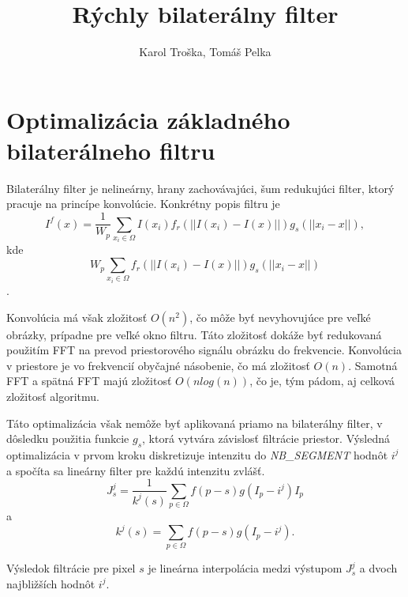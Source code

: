 \documentclass[]{article}
\title{Rýchly bilaterálny filter}
\author{Karol Troška, Tomáš Pelka}
\begin{document}
\maketitle

\section*{Optimalizácia základného bilaterálneho filtru}

Bilaterálny filter je nelineárny, hrany zachovávajúci, šum redukujúci filter, ktorý pracuje na princípe konvolúcie. Konkrétny popis filtru je  $$I^f(x)=\frac{1}{W_p} \sum_{x_i\in \Omega}I(x_i)f_r(||I(x_i) - I(x)||)g_s(||x_i - x||),$$kde $$W_p \sum_{x_i\in \Omega}f_r(||I(x_i) - I(x)||)g_s(||x_i - x||)$$.

Konvolúcia má však zložitosť $O(n^2)$, čo môže byť nevyhovujúce pre veľké obrázky, prípadne pre veľké okno filtru. Táto zložitosť dokáže byť redukovaná použitím FFT na prevod priestorového signálu obrázku do frekvencie. Konvolúcia v priestore je vo frekvencií obyčajné násobenie, čo má zložitosť $O(n)$. Samotná FFT a spätná FFT majú zložitosť $O(n log(n))$, čo je, tým pádom, aj celková zložitosť algoritmu.

Táto optimalizácia však nemôže byť aplikovaná priamo na bilaterálny filter, v dôsledku použitia funkcie $g_s$, ktorá vytvára závislosť filtrácie priestor. Výsledná optimalizácia v prvom kroku diskretizuje intenzitu do \emph{NB\_SEGMENT} hodnôt ${i^j}$ a spočíta sa lineárny filter pre každú intenzitu zvlášť.
$$ J^j_s = \frac{1}{k^j(s)}\sum_{p \in \Omega}f(p-s)g(I_p-i^j)I_p$$ a $$k^j(s)=\sum_{p \in \Omega}f(p-s)g(I_p-i^j).$$

Výsledok filtrácie pre pixel $s$ je lineárna interpolácia medzi výstupom $J^j_s$ a dvoch najbližších hodnôt $i^j$.
\end{document}
